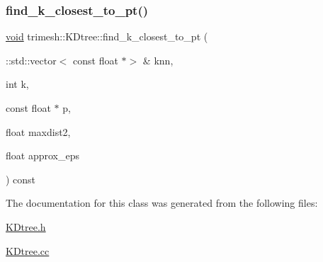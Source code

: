 \mbox{\label{classtrimesh_1_1KDtree_a1466c3d0b144459fb4472ea05f6d70bc}} 
\subsubsection{\texorpdfstring{find\+\_\+k\+\_\+closest\+\_\+to\+\_\+pt()}{find\_k\_closest\_to\_pt()}\hspace{0.1cm}{\footnotesize\ttfamily [2/2]}}
{\footnotesize\ttfamily \hyperlink{namespacetrimesh_a784ddfd979e1c579bda795a8edfc3f43}{void} trimesh\+::\+K\+Dtree\+::find\+\_\+k\+\_\+closest\+\_\+to\+\_\+pt (\begin{DoxyParamCaption}\item[{\+::std\+::vector$<$ const float $\ast$$>$ \&}]{knn,  }\item[{int}]{k,  }\item[{const float $\ast$}]{p,  }\item[{float}]{maxdist2,  }\item[{float}]{approx\+\_\+eps }\end{DoxyParamCaption}) const\hspace{0.3cm}{\ttfamily [inline]}}



The documentation for this class was generated from the following files\+:\begin{DoxyCompactItemize}
\item 
\hyperlink{KDtree_8h}{K\+Dtree.\+h}\item 
\hyperlink{KDtree_8cc}{K\+Dtree.\+cc}\end{DoxyCompactItemize}
